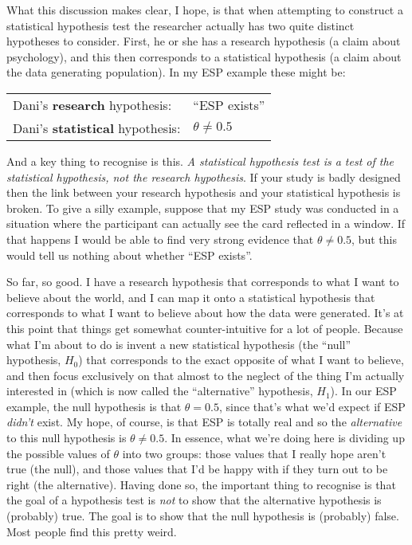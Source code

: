 What this discussion makes clear, I hope, is that when attempting to construct a statistical hypothesis test the researcher actually has two quite distinct hypotheses to consider. First, he or she has a research hypothesis (a claim about psychology), and this then corresponds to a statistical hypothesis (a claim about the data generating population). In my ESP example these might be:
\begin{center}
\begin{tabular}{ll}
Dani's {\bf research} hypothesis: & ``ESP exists'' \\
Dani's {\bf statistical} hypothesis: & $\theta \neq 0.5$ \\
\end{tabular} 
\end{center}
And a key thing to recognise is this. {\it A statistical hypothesis test is a test of the statistical hypothesis, not the research hypothesis}. If your study is badly designed then the link between your research hypothesis and your statistical hypothesis is broken. To give a silly example, suppose that my ESP study was conducted in a situation where the participant can actually see the card reflected in a window. If that happens I would be able to find very strong evidence that $\theta \neq 0.5$, but this would tell us nothing about whether ``ESP exists''. 


So far, so good. I have a research hypothesis that corresponds to what I want to believe about the world, and I can map it onto a statistical hypothesis that corresponds to what I want to believe about how the data were generated. It's at this point that things get somewhat counter-intuitive for a lot of people. Because what I'm about to do is invent a new statistical hypothesis (the ``null'' hypothesis, $H_0$) that corresponds to the exact opposite of what I want to believe, and then focus exclusively on that almost to the neglect of the thing I'm actually interested in (which is now called the ``alternative'' hypothesis, $H_1$). In our ESP example, the null hypothesis is that $\theta = 0.5$, since that's what we'd expect if ESP {\it didn't} exist. My hope, of course, is that ESP is totally real and so the {\it alternative} to this null hypothesis is $\theta \neq 0.5$. In essence, what we're doing here is dividing up the possible values of $\theta$ into two groups: those values that I really hope aren't true (the null), and those values that I'd be happy with if they turn out to be right (the alternative). Having done so, the important thing to recognise is that the goal of a hypothesis test is {\it not} to show that the alternative hypothesis is (probably) true. The goal is to show that the null hypothesis is (probably) false. Most people find this pretty weird. 

